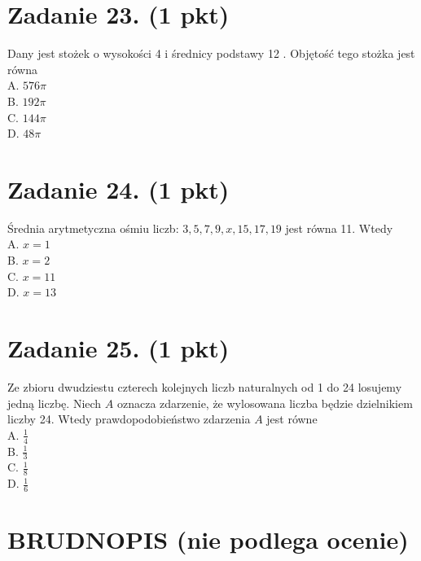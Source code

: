 \documentclass[10pt]{article}
\begin{document}
\section*{Zadanie 23. (1 pkt)}
Dany jest stożek o wysokości 4 i średnicy podstawy 12 . Objętość tego stożka jest równa\\
A. \(576 \pi\)\\
B. \(192 \pi\)\\
C. \(144 \pi\)\\
D. \(48 \pi\)

\section*{Zadanie 24. (1 pkt)}
Średnia arytmetyczna ośmiu liczb: \(3,5,7,9, x, 15,17,19\) jest równa 11. Wtedy\\
A. \(x=1\)\\
B. \(x=2\)\\
C. \(x=11\)\\
D. \(x=13\)

\section*{Zadanie 25. (1 pkt)}
Ze zbioru dwudziestu czterech kolejnych liczb naturalnych od 1 do 24 losujemy jedną liczbę. Niech \(A\) oznacza zdarzenie, że wylosowana liczba będzie dzielnikiem liczby 24. Wtedy prawdopodobieństwo zdarzenia \(A\) jest równe\\
A. \(\frac{1}{4}\)\\
B. \(\frac{1}{3}\)\\
C. \(\frac{1}{8}\)\\
D. \(\frac{1}{6}\)

\section*{BRUDNOPIS (nie podlega ocenie)}
\end{document}
